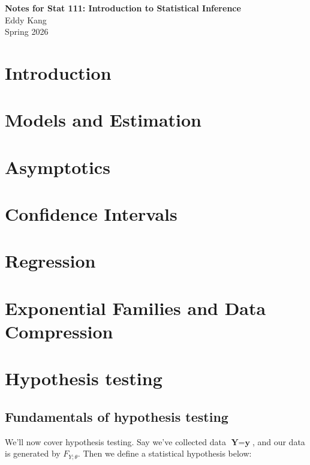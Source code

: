 \documentclass[12pt]{article}
\begin{document}
\begin{titlepage}
    \vspace*{\fill}
    \begin{center}
        {\Huge \textbf{Notes for Stat 111: Introduction to Statistical Inference} \\[0.6cm]}
        {\Large Eddy Kang \\[0.4cm]}
        {\large Spring 2026}
    \end{center}
    \vspace*{\fill}
\end{titlepage}
\newpage
\newpage

\section{Introduction}

\section{Models and Estimation}

\section{Asymptotics}

\section{Confidence Intervals}

\section{Regression}

\section{Exponential Families and Data Compression}

\section{Hypothesis testing}

\subsection{Fundamentals of hypothesis testing}
We'll now cover hypothesis testing. Say we've collected data $\textbf{Y} = \textbf{y}$, and our data is generated by $F_{Y;\theta}$. Then we define a statistical hypothesis below:
\end{document}
